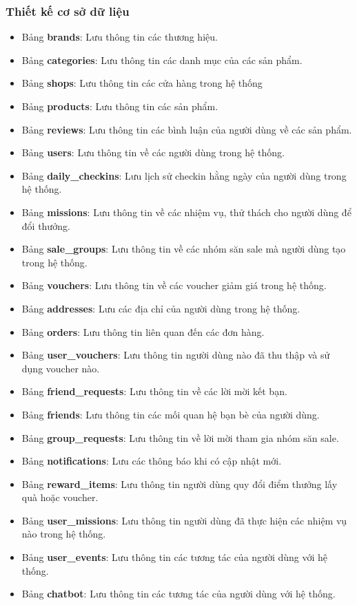 \documentclass[../DoAn.tex]{subfiles}
\begin{document}
\subsubsection{Thiết kế cơ sở dữ liệu}
\begin{itemize}
    \item Bảng \textbf{brands}: Lưu thông tin các thương hiệu.
    \item Bảng \textbf{categories}: Lưu thông tin các danh mục của các sản phẩm.
     \item Bảng \textbf{shops}: Lưu thông tin các cửa hàng trong hệ thống
    \item Bảng \textbf{products}: Lưu thông tin các sản phẩm.
    \item Bảng \textbf{reviews}: Lưu thông tin các bình luận của người dùng về các sản phẩm.
    \item Bảng \textbf{users}: Lưu thông tin về các người dùng trong hệ thống.
    \item Bảng \textbf{daily\_checkins}: Lưu lịch sử checkin hằng ngày của người dùng trong hệ thống.
    \item Bảng \textbf{missions}: Lưu thông tin về các nhiệm vụ, thử thách cho người dùng để đổi thưởng.
    \item Bảng \textbf{sale\_groups}: Lưu thông tin về các nhóm săn sale mà người dùng tạo trong hệ thống.
    \item Bảng \textbf{vouchers}: Lưu thông tin về các voucher giảm giá trong hệ thống.
    \item Bảng \textbf{addresses}: Lưu các địa chỉ của người dùng trong hệ thống.
    \item Bảng \textbf{orders}: Lưu thông tin liên quan đến các đơn hàng.
    \item Bảng \textbf{user\_vouchers}: Lưu thông tin người dùng nào đã thu thập và sử dụng voucher nào.
    \item Bảng \textbf{friend\_requests}: Lưu thông tin về các lời mời kết bạn.
    \item Bảng \textbf{friends}: Lưu thông tin các mối quan hệ bạn bè của người dùng.
    \item Bảng \textbf{group\_requests}: Lưu thông tin về lời mời tham gia nhóm săn sale.
    \item Bảng \textbf{notifications}: Lưu các thông báo khi có cập nhật mới.  %
    \item Bảng \textbf{reward\_items}: Lưu thông tin người dùng quy đổi điểm thưởng lấy quà hoặc voucher.
    \item Bảng \textbf{user\_missions}: Lưu thông tin người dùng đã thực hiện các nhiệm vụ nào trong hệ thống.
    \item Bảng \textbf{user\_events}: Lưu thông tin các tương tác của người dùng với hệ thống.
     \item Bảng \textbf{chatbot}: Lưu thông tin các tương tác của người dùng với hệ thống.
\end{itemize}
\end{document}

